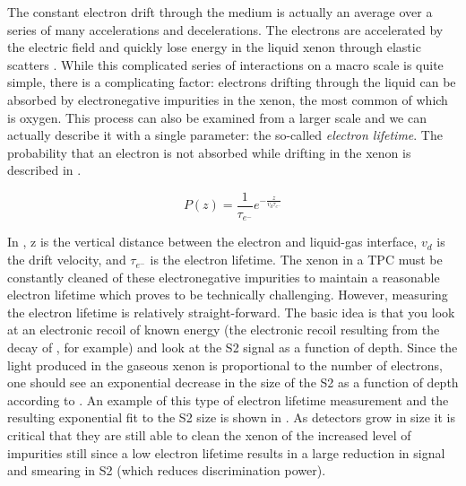 The constant electron drift through the medium is actually an average over a series of many accelerations and decelerations.  The electrons are accelerated by the electric field and quickly lose energy in the liquid xenon through elastic scatters \cite{atrazhev2005electron}.  While this complicated series of interactions on a macro scale is quite simple, there is a complicating factor: electrons drifting through the liquid can be absorbed by electronegative impurities in the xenon, the most common of which is oxygen.  This process can also be examined from a larger scale and we can actually describe it with a single parameter: the so-called \textit{electron lifetime}.  The probability that an electron is not absorbed while drifting in the xenon is described in .

\begin{equation}
        \label{eqn:tpc_electron_lifetime}
        P(z) = \frac{1}{\tau_{e^-}} e^{-\frac{z}{v_d \tau_{e^-}}}
\end{equation}

In , z is the vertical distance between the electron and liquid-gas interface, $v_d$ is the drift velocity, and $\tau_{e^-}$ is the electron lifetime.  The xenon in a TPC must be constantly cleaned of these electronegative impurities to maintain a reasonable electron lifetime which proves to be technically challenging.  However, measuring the electron lifetime is relatively straight-forward.  The basic idea is that you look at an electronic recoil of known energy (the electronic recoil resulting from the decay of , for example) and look at the S2 signal as a function of depth.   Since the light produced in the gaseous xenon is proportional to the number of electrons, one should see an exponential decrease in the size of the S2 as a function of depth according to .  An example of this type of electron lifetime measurement and the resulting exponential fit to the S2 size is shown in .  As detectors grow in size it is critical that they are still able to clean the xenon of the increased level of impurities still since a low electron lifetime results in a large reduction in signal and smearing in S2 (which reduces discrimination power).

